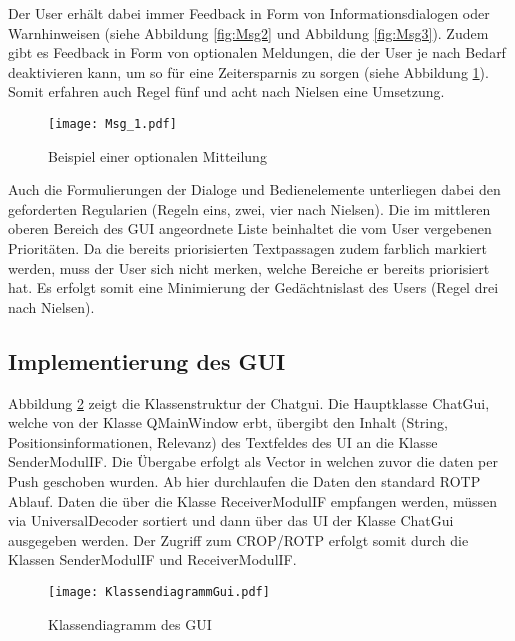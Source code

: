 Der User erh{\"a}lt dabei immer Feedback in Form von
Informationsdialogen oder Warnhinweisen (siehe Abbildung \ref{fig:Msg2} und
Abbildung
\ref{fig:Msg3}). Zudem gibt es Feedback in Form von optionalen Meldungen, die
der User je nach Bedarf deaktivieren kann, um so f{\"u}r eine Zeitersparnis zu
sorgen (siehe Abbildung \ref{fig:Msg1}). Somit erfahren auch Regel f{\"u}nf und
acht nach Nielsen eine Umsetzung.

\begin{figure}[H]
\centering
\texttt{[image: Msg\_1.pdf]}
\caption{Beispiel einer optionalen Mitteilung}
\label{fig:Msg1}
\end{figure}

Auch die Formulierungen der Dialoge und Bedienelemente unterliegen dabei den
geforderten Regularien (Regeln eins, zwei, vier nach Nielsen). Die im mittleren
oberen Bereich des \gls{GUI} angeordnete Liste beinhaltet die vom User
vergebenen Priorit{\"a}ten. Da die bereits priorisierten Textpassagen zudem farblich
markiert werden, muss der User sich nicht merken, welche Bereiche er bereits
priorisiert hat. Es erfolgt somit eine Minimierung der Ged{\"a}chtnislast des
Users (Regel drei nach Nielsen).

\subsection{Implementierung des GUI}

Abbildung \ref{fig:KlassendiagrammGui} zeigt die Klassenstruktur der Chatgui.
Die Hauptklasse ChatGui, welche von der Klasse QMainWindow erbt, {\"u}bergibt
den Inhalt (String, Positionsinformationen, Relevanz) des Textfeldes des UI an
die Klasse SenderModulIF.
Die {\"U}bergabe erfolgt als Vector in welchen zuvor die daten per Push geschoben wurden. Ab hier
durchlaufen die Daten den standard ROTP Ablauf. Daten die {\"u}ber
die Klasse ReceiverModulIF empfangen werden, m{\"u}ssen via UniversalDecoder
sortiert und dann {\"u}ber das UI der Klasse ChatGui ausgegeben werden. Der
Zugriff zum CROP/ROTP erfolgt somit durch die Klassen SenderModulIF und
ReceiverModulIF.

\begin{figure}[H]
\centering
\texttt{[image: KlassendiagrammGui.pdf]}
\caption{Klassendiagramm des GUI}
\label{fig:KlassendiagrammGui}
\end{figure}


